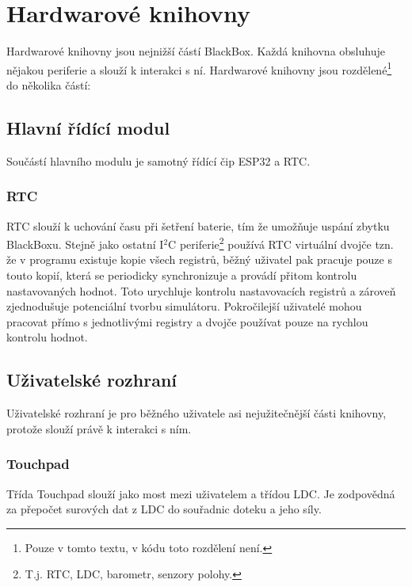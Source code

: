 \chapter{Hardwarové knihovny}
Hardwarové knihovny jsou nejnižší částí BlackBox.
Každá knihovna obsluhuje nějakou periferie a slouží k interakci s ní.
Hardwarové knihovny jsou rozdělené\footnote{Pouze v tomto textu, v kódu toto rozdělení není.} do několika částí:

\section{Hlavní řídící modul}

Součástí hlavního modulu je samotný řídící čip ESP32 a RTC.

\subsection{RTC}\label{ss:rtc}

RTC slouží k uchování času při šetření baterie, tím že umožňuje uspání zbytku BlackBoxu.
Stejně jako ostatní I$^2$C periferie\footnote{T.j. RTC, LDC, barometr, senzory polohy.} používá RTC virtuální dvojče tzn. že v programu existuje kopie všech registrů, běžný uživatel pak pracuje pouze s touto kopií, která se periodicky synchronizuje a provádí přitom kontrolu nastavovaných hodnot.
Toto urychluje kontrolu nastavovacích registrů a zároveň zjednodušuje potenciální tvorbu simulátoru.
Pokročilejší uživatelé mohou pracovat přímo s jednotlivými registry a dvojče používat pouze na rychlou kontrolu hodnot.

\section{Uživatelské rozhraní}

Uživatelské rozhraní je pro běžného uživatele asi nejužitečnější části knihovny, protože slouží právě k interakci s ním.

\subsection{Touchpad}

Třída Touchpad slouží jako most mezi uživatelem a třídou LDC.
Je zodpovědná za přepočet surových dat z LDC do souřadnic doteku a jeho síly.

